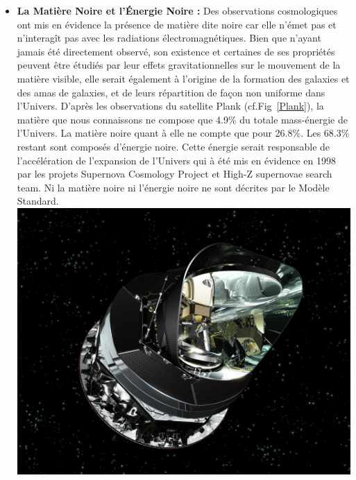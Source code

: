\begin{itemize}[label=$\bullet$]
\item \textbf{La Matière Noire et l'Énergie Noire :} Des observations cosmologiques ont mis en évidence la présence de matière dite noire car elle n'émet pas et n'interagît pas avec les radiations électromagnétiques. Bien que n'ayant jamais été directement observé, son existence et certaines de ses propriétés peuvent être étudiés par leur effets gravitationnelles sur le mouvement de la matière visible, elle serait  également à l'origine de la formation des galaxies et des amas de galaxies, et de leurs répartition de façon non uniforme dans l'Univers. D'après les observations du satellite Plank (cf.Fig~\ref{Plank}),
la matière que nous connaissons ne compose que \num{4.9}\% du totale mass-énergie de l'Univers. La matière noire quant à elle ne compte que pour \num{26.8}\%. Les \num{68.3}\% restant sont composés d'énergie noire. Cette énergie serait responsable de l'accélération de  l'expansion de l'Univers qui à été mis en évidence en \num{1998} par les projets Supernova Cosmology Project et High-Z supernovae search team. Ni la matière noire ni l'énergie noire ne sont décrites par le Modèle Standard.
\marginpar
{
\centering
\includegraphics[width=\marginparwidth]{SM/plank.jpg}
\label{Plank}
} 


\end{itemize}
